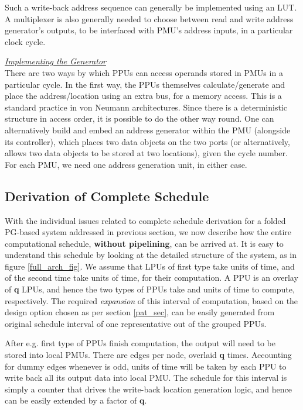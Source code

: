 \documentclass[12pt]{article}
\begin{document}
Such a write-back address sequence can generally be implemented using an
LUT. A multiplexer is also generally needed to choose between read and
write address generator's outputs, to be interfaced with PMU's
address inputs, in a particular clock cycle.

\noindent \uline{\textit{Implementing the Generator}} \\
There are two ways by which PPUs can access operands stored in
PMUs in a particular cycle. In the first way, the PPUs
themselves calculate/generate and place the address/location using an extra
bus, for a memory access. This is a standard practice in
von Neumann
architectures. Since there is a deterministic structure in access order, it
is possible to do the other way round. One can alternatively build and
embed an address generator within the PMU (alongside its controller), which places two data
objects on the two ports (or alternatively, allows two data objects to be
stored at two locations), given the cycle number. For each PMU, we need one address generation unit, in either case.

\subsection{Derivation of Complete Schedule}
\label{comp_sched_sec}
With the individual issues related to complete schedule derivation for a
folded PG-based system addressed in previous section, we now describe how
the entire computational schedule, \textbf{without pipelining}, can be
arrived at. It is easy to understand this schedule by looking at the
detailed structure of the system, as in figure \ref{full_arch_fig}. We
assume that LPUs of first type take  units
of time, and of the second time take  units of time, for
their computation. A PPU
is an overlay of \textbf{q} LPUs, and hence the two types of
PPUs take  and 
units of time to compute, respectively. The required \textit{expansion} of
this interval of computation, based on the design option chosen as per
section \ref{pat_sec}, can be easily generated from original schedule
interval of one representative out of the grouped PPUs.

After e.g. first type of PPUs finish computation, the output
will need to be stored into local PMUs. There are  edges
per node, overlaid \textbf{q} times. Accounting for dummy edges whenever
 is odd,  units of
time will be taken by each PPU to write back all its output
data into local PMU. The schedule for this interval is simply a
counter that drives the write-back location generation logic, and hence can
be easily extended by a factor of \textbf{q}.
\end{document}

